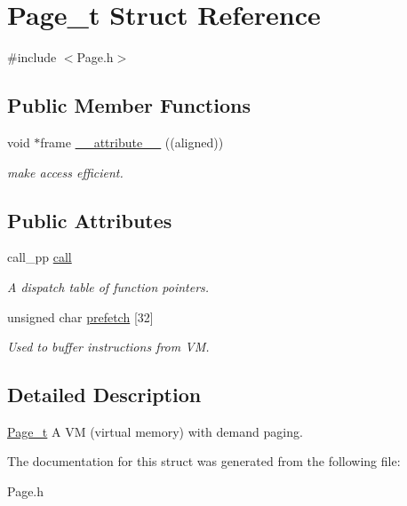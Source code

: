 \hypertarget{struct_page__t}{}\section{Page\+\_\+t Struct Reference}
\label{struct_page__t}


{\ttfamily \#include $<$Page.\+h$>$}

\subsection*{Public Member Functions}
\begin{DoxyCompactItemize}
\item 
\hypertarget{struct_page__t_a8225d54adb784d52fbfdae9bdffcd739}{}void $\ast$frame \hyperlink{struct_page__t_a8225d54adb784d52fbfdae9bdffcd739}{\+\_\+\+\_\+attribute\+\_\+\+\_\+} ((aligned))\label{struct_page__t_a8225d54adb784d52fbfdae9bdffcd739}

\begin{DoxyCompactList}\small\item\em make access efficient. \end{DoxyCompactList}\end{DoxyCompactItemize}
\subsection*{Public Attributes}
\begin{DoxyCompactItemize}
\item 
\hypertarget{struct_page__t_ae99ef0e481a3e2e01802a1e881c546b6}{}call\+\_\+pp \hyperlink{struct_page__t_ae99ef0e481a3e2e01802a1e881c546b6}{call}\label{struct_page__t_ae99ef0e481a3e2e01802a1e881c546b6}

\begin{DoxyCompactList}\small\item\em A dispatch table of function pointers. \end{DoxyCompactList}\item 
\hypertarget{struct_page__t_ae4e44564fbf5003c8faf21c0bc0f8736}{}unsigned char \hyperlink{struct_page__t_ae4e44564fbf5003c8faf21c0bc0f8736}{prefetch} \mbox{[}32\mbox{]}\label{struct_page__t_ae4e44564fbf5003c8faf21c0bc0f8736}

\begin{DoxyCompactList}\small\item\em Used to buffer instructions from V\+M. \end{DoxyCompactList}\end{DoxyCompactItemize}


\subsection{Detailed Description}
\hyperlink{struct_page__t}{Page\+\_\+t} A V\+M (virtual memory) with demand paging. 

The documentation for this struct was generated from the following file\+:\begin{DoxyCompactItemize}
\item 
Page.\+h\end{DoxyCompactItemize}
